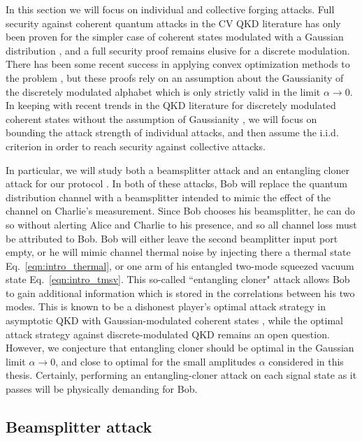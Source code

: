 In this section we will focus on individual and collective forging attacks. Full security against coherent quantum attacks in the CV QKD literature has only been proven for the simpler case of coherent states modulated with a Gaussian distribution \cite{Lodewyck2007, Leverrier2010c, Pirandola2008, Leverrier2015, Laudenbach2017, Furrer2012}, and a full security proof remains elusive for a discrete modulation. There has been some recent success in applying convex optimization methods to the problem \cite{Ghorai2019, Lin2019}, but these proofs rely on an assumption about the Gaussianity of the discretely modulated alphabet \cite{Leverrier2009} which is only strictly valid in the limit $\alpha \rightarrow 0$. In keeping with recent trends in the QKD literature for discretely modulated coherent states without the assumption of Gaussianity \cite{Papanastasiou2018},  we will focus on bounding the attack strength of individual attacks, and then assume the i.i.d. criterion \cite{Leverrier2017, Laudenbach2017} in order to reach security against collective attacks. 


In particular, we will study both a beamsplitter attack and an entangling cloner attack for our protocol \cite{Grosshans2002, Grosshans2003}. In both of these attacks, Bob will replace the quantum distribution channel with a beamsplitter intended to mimic the effect of the channel on Charlie's measurement. Since Bob chooses his beamsplitter, he can do so without alerting Alice and Charlie to his presence, and so all channel loss must be attributed to Bob. Bob will either leave the second beamplitter input port empty, or he will mimic channel thermal noise by injecting there a thermal state Eq.~\ref{eqn:intro_thermal}, or one arm of his entangled two-mode squeezed vacuum state Eq.~\ref{eqn:intro_tmsv}. This so-called ``entangling cloner" attack allows Bob to gain additional information which is stored in the correlations between his two modes. This is known to be a dishonest player's optimal attack strategy in asymptotic QKD with Gaussian-modulated coherent states \cite{Lodewyck2007, Laudenbach2017}, while the optimal attack strategy against discrete-modulated QKD remains an open question. However, we conjecture that entangling cloner should be optimal in the Gaussian limit $\alpha \rightarrow 0$, and close to optimal for the small amplitudes $\alpha$ considered in this thesis. Certainly, performing an entangling-cloner attack on each signal state as it passes will be physically demanding for Bob.

\subsection{Beamsplitter attack}

